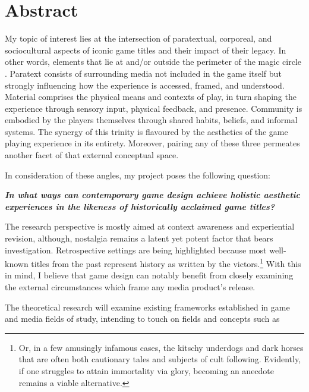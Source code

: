 \documentclass[12pt,oneside]{book}
\begin{document}
\chapter*{Abstract}
\begin{center}\begin{singlespace}\vspace{-4mm}
    My topic of interest lies at the intersection of paratextual, corporeal, and sociocultural aspects of iconic game titles and their impact of their legacy.
    In other words, elements that lie at and/or outside the perimeter of the magic circle \parencite{huizinga}.
    Paratext consists of surrounding media not included in the game itself but strongly influencing how the experience is accessed, framed, and understood.
    Material comprises the physical means and contexts of play, in turn shaping the experience through sensory input, physical feedback, and presence. 
    Community is embodied by the players themselves through shared habits, beliefs, and informal systems.
    The synergy of this trinity is flavoured by the aesthetics of the game playing experience in its entirety.
    Moreover, pairing any of these three permeates another facet of that external conceptual space.\par
    In consideration of these angles, my project poses the following question:
    \begin{displayquote}
        \textbf{\textit{In what ways can contemporary game design achieve holistic aesthetic experiences in the likeness of historically acclaimed game titles?}}
    \end{displayquote}
    The research perspective is mostly aimed at context awareness and experiential revision, although, nostalgia remains a latent yet potent factor that bears investigation.
    Retrospective settings are being highlighted because most well-known titles from the past represent history as written by the victors.\footnote{Or, in a few amusingly infamous cases, the kitschy underdogs and dark horses that are often both cautionary tales and subjects of cult following. Evidently, if one struggles to attain immortality via glory, becoming an anecdote remains a viable alternative.}
    With this in mind, I believe that game design can notably benefit from closely examining the external circumstances which frame any media product's release.\par
    The theoretical research will examine existing frameworks established in game and media fields of study, intending to touch on fields and concepts such as 

\end{singlespace}
\end{center}
\end{document}
